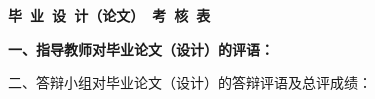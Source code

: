 \cleardoublepage{}
{
  \begin{center}
    {\bfseries\fangsong{} 毕~业~设~计（论文）~考~核~表}
  \end{center}
}
{
}

{
    \bfseries
    \noindent 一、指导教师对毕业论文（设计）的评语：\\
    \vskip 50mm

    \signature{指导教师（签名）}

    \noindent 二、答辩小组对毕业论文（设计）的答辩评语及总评成绩：\\

    \mbox{} \vfill

    {
      \eefinaleval[10][15][5][62][8][100]
      \signature{答辩小组负责人（签名）}
    }
    {
      \finaleval[10][15][5][70][100]
      \signature{负责人（签名）}
    }
}